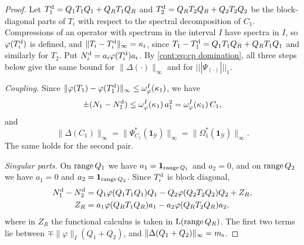 \begin{proof}
Let $T_1^{\rm d}=Q_1T_1Q_1+Q_RT_1Q_R$ and $T_2^{\rm d}=Q_RT_2Q_R+Q_2T_2Q_2$ be the block-diagonal parts of $T_i$ with respect to the spectral decomposition of $C_1$. Compressions of an operator with spectrum in the interval $I$ have spectra in $I$, so $\varphi(T_i^{\rm d})$ is defined, and $\|T_i-T_i^{\rm d}\|_\infty=\kappa_i$, since $T_1-T_1^{\rm d}=Q_1T_1Q_R+Q_RT_1Q_1$ and similarly for $T_2$. Put $N_i^{\rm d}=a_i\varphi(T_i^{\rm d})a_i$. By \eqref{cont:eq:cp domination}, all three steps below give the same bound for $\|\Delta(\cdot)\|_\infty$ and for $|||\Psi_{(\cdot)}|||_1$.

\emph{Coupling.} Since $\|\varphi(T_1)-\varphi(T_1^{\rm d})\|_\infty\leq\omega^I_\varphi(\kappa_1)$, we have
\[
\pm(N_1-N_1^{\rm d})\leq\omega^I_\varphi(\kappa_1)\,a_1^2=\omega^I_\varphi(\kappa_1)\,C_1,
\]
and
\[
\|\Delta(C_1)\|_\infty=\|\Psi_{C_1}^*(\mathbf{1}_{\mathcal{Y}})\|_\infty=\|\Omega_1^*(\mathbf{1}_{\mathcal{Y}})\|_\infty.
\]
The same holds for the second pair.

\emph{Singular parts.} On $\operatorname{range} Q_1$ we have $a_1=\mathbf{1}_{\operatorname{range} Q_1}$ and $a_2=0$, and on $\operatorname{range} Q_2$ we have $a_1=0$ and $a_2=\mathbf{1}_{\operatorname{range} Q_2}$. Since $T_i^{\rm d}$ is block diagonal,
\[
\begin{aligned}N_1^{\rm d}-N_2^{\rm d}&=Q_1\varphi(Q_1T_1Q_1)Q_1-Q_2\varphi(Q_2T_2Q_2)Q_2+Z_R,\\ Z_R&=a_1\varphi(Q_RT_1Q_R)a_1-a_2\varphi(Q_RT_2Q_R)a_2,\end{aligned}
\]
where in $Z_R$ the functional calculus is taken in $\mathrm{L}(\operatorname{range} Q_R)$. The first two terms lie between $\mp\|\varphi\|_I(Q_1+Q_2)$, and $\|\Delta(Q_1+Q_2)\|_\infty=m_{\rm s}$.


\end{proof}
